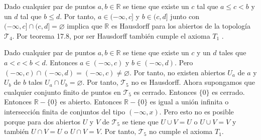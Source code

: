 \documentclass{article}
\begin{document}
Dado cualquier par de puntos $a,b\in \mathbb{R}$ se tiene que existe un $c$ tal que $a\leq c<b$ y un $d$ tal que $b\leq d$. Por tanto, $a\in (-\infty,c]$ y $b\in (c,d]$ junto con $(-\infty,c]\cap(c,d]=\varnothing$ implica que $\mathbb{R}$ es Hausdorff para los abiertos de la topología $\mathcal{T}_4$. Por teorema 17.8, por ser Hausdorff también cumple el axioma $T_1$ .

Dado cualquier par de puntos $a,b\in \mathbb{R}$ se tiene que existe un $c$ y un $d$ tales que $a< c<b<d$. Entonces $a\in (-\infty, c) $ y $b\in (-\infty, d)$. Pero $(-\infty, c)\cap(-\infty, d)=(-\infty, c)\neq \varnothing$. Por tanto, no existen abiertos $U_a$ de $a$ y $U_b$ de $b$ tales $U_a\cap U_b =\varnothing$. Por tanto, $\mathcal{T}_5$ no es Hausdorff. Ahora supongamos que cualquier conjunto finito de puntos en $\mathcal{T}_5$ es cerrado. Entonces $\{0\}$ es cerrado. Entonces $\mathbb{R}-\{0\}$ es abierto. Entonces $\mathbb{R}-\{0\}$ es igual a unión infinita o intersección finita de conjuntos del tipo $(-\infty,x)$. Pero esto no es posible porque para dos abiertos $U$ y $V$ de $\mathcal{T}_5$ se tiene que $U\cup V=U$ o $U\cup V=V$ y también $U\cap V=U$ o $U\cap V=V$. Por tanto, $\mathcal{T}_5$ no cumple el axioma $T_1$.
\end{document}
